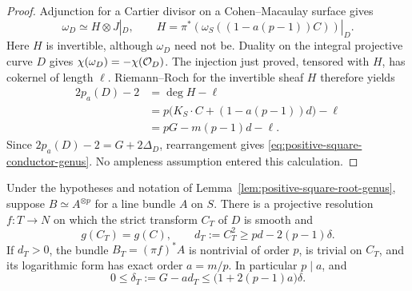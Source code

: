 \begin{proof}
Adjunction for a Cartier divisor on a Cohen--Macaulay surface gives
\[
 \omega_D\simeq H\otimes J|_D,\qquad
 H=\pi^*\!\left(\omega_S((1-a(p-1))C)\right)|_D.
\]
Here $H$ is invertible, although $\omega_D$ need not be.
Duality on the integral projective curve $D$ gives
$\chi(\omega_D)=-\chi(\mathcal O_D)$.
The injection just proved, tensored with $H$, has cokernel of
length $\ell$. Riemann--Roch for the invertible sheaf $H$ therefore
yields
\begin{align*}
 2p_a(D)-2
 &=\deg H-\ell\\
 &=p\bigl(K_S\cdot C+(1-a(p-1))d\bigr)-\ell\\
 &=pG-m(p-1)d-\ell.
\end{align*}
Since $2p_a(D)-2=G+2\Delta_D$, rearrangement gives
\eqref{eq:positive-square-conductor-genus}.
No ampleness assumption entered this calculation.
\end{proof}

\begin{lemma}
\label{lem:positive-square-resolved-transfer}
Under the hypotheses and notation of
Lemma~\ref{lem:positive-square-root-genus}, suppose
$B\simeq A^{\otimes p}$ for a line bundle $A$ on $S$.
There is a projective resolution $f:T\to N$ on which the strict
transform $C_T$ of $D$ is smooth and
\begin{equation}\label{eq:positive-square-transfer-square}
 g(C_T)=g(C),\qquad
 d_T:=C_T^2\geq pd-2(p-1)\delta.
\end{equation}
If $d_T>0$, the bundle $B_T=(\pi f)^*A$ is nontrivial of order $p$,
is trivial on $C_T$, and its logarithmic form has exact order
$a=m/p$. In particular $p\mid a$, and
\begin{equation}\label{eq:positive-square-excess-recurrence}
 0\leq\delta_T:=G-a d_T
       \leq\bigl(1+2(p-1)a\bigr)\delta.
\end{equation}
\end{lemma}

